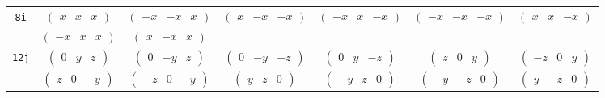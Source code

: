 \documentclass[fleqn,9pt,landscape]{jsarticle}
\begin{document}
\begin{center}
\begin{longtable}{ccccccc}
{\tt 8i} & $ \begin{pmatrix} x & x & x \end{pmatrix} $ & $ \begin{pmatrix} - x & - x & x \end{pmatrix} $ & $ \begin{pmatrix} x & - x & - x \end{pmatrix} $ & $ \begin{pmatrix} - x & x & - x \end{pmatrix} $ & $ \begin{pmatrix} - x & - x & - x \end{pmatrix} $ & $ \begin{pmatrix} x & x & - x \end{pmatrix} $ \\
& $ \begin{pmatrix} - x & x & x \end{pmatrix} $ & $ \begin{pmatrix} x & - x & x \end{pmatrix} $ & $  $ & $  $ & $  $ & $  $ \\ \hline
{\tt 12j} & $ \begin{pmatrix} 0 & y & z \end{pmatrix} $ & $ \begin{pmatrix} 0 & - y & z \end{pmatrix} $ & $ \begin{pmatrix} 0 & - y & - z \end{pmatrix} $ & $ \begin{pmatrix} 0 & y & - z \end{pmatrix} $ & $ \begin{pmatrix} z & 0 & y \end{pmatrix} $ & $ \begin{pmatrix} - z & 0 & y \end{pmatrix} $ \\
& $ \begin{pmatrix} z & 0 & - y \end{pmatrix} $ & $ \begin{pmatrix} - z & 0 & - y \end{pmatrix} $ & $ \begin{pmatrix} y & z & 0 \end{pmatrix} $ & $ \begin{pmatrix} - y & z & 0 \end{pmatrix} $ & $ \begin{pmatrix} - y & - z & 0 \end{pmatrix} $ & $ \begin{pmatrix} y & - z & 0 \end{pmatrix} $ \\ \hline

\end{longtable}
\end{center}
\end{document}

